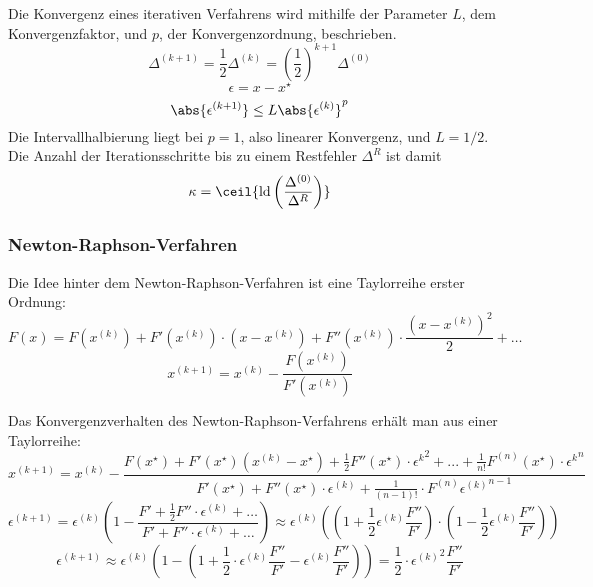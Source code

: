 Die Konvergenz eines iterativen Verfahrens wird mithilfe der Parameter $L$, dem Konvergenzfaktor, und $p$, der Konvergenzordnung, beschrieben.
\[\Delta^{(k + 1)} = \frac{1}{2} \Delta^{(k)} = (\frac{1}{2})^{k + 1} \Delta^{(0)}\]
\[\epsilon = x - x^\star\]
\[\abs{\epsilon^{(k + 1)}} \le L \abs{\epsilon^{(k)}}^p\]
Die Intervallhalbierung liegt bei $p = 1$, also linearer Konvergenz, und $L = 1/2$. Die Anzahl der Iterationsschritte bis zu einem Restfehler $\Delta^R$ ist damit
\[\kappa = \ceil{\ld \left( \frac{\Delta^{(0)}}{\Delta^R}\right)}\]

\begin{center}
\end{center}

\subsubsection{Newton-Raphson-Verfahren} Die Idee hinter dem Newton-Raphson-Verfahren ist eine Taylorreihe erster Ordnung:
\[F(x) = F(x^{(k)}) + F'(x^{(k)}) \cdot (x - x^{(k)}) + F''(x^{(k)}) \cdot \frac{(x - x^{(k)})^2}{2} + \dots\]
\[x^{(k + 1)} = x^{(k)} - \frac{F(x^{(k)})}{F'(x^{(k)})}\]

Das Konvergenzverhalten des Newton-Raphson-Verfahrens erhält man aus einer Taylorreihe:
\[x^{(k + 1)} = x^{(k)} - \frac{F(x^\star) + F'(x^\star)(x^{(k)} - x^\star) + \frac{1}{2} F''(x^\star) \cdot {\epsilon^{k}}^2 + ... + \frac{1}{n!} F^{(n)}(x^\star) \cdot {\epsilon^{k}}^n}{F'(x^\star) + F''(x^\star) \cdot \epsilon^{(k)} + \frac{1}{(n - 1)!} \cdot F^{(n)} {\epsilon^{(k)}}^{n - 1}}\]
\[\epsilon^{(k + 1)} = \epsilon^{(k)} \left( 1 - \frac{F' + \frac{1}{2} F'' \cdot \epsilon^{(k)} + \dots}{F' + F'' \cdot \epsilon^{(k)} + \dots} \right) \approx \epsilon^{(k)} \left( \left(1 + \frac{1}{2} \epsilon^{(k)} \frac{F''}{F'} \right) \cdot \left( 1 - \frac{1}{2} \epsilon^{(k)} \frac{F''}{F'} \right) \right)\]
\[\epsilon^{(k + 1)} \approx \epsilon^{(k)} \left( 1 - \left( 1 + \frac{1}{2} \cdot \epsilon^{(k)} \frac{F''}{F'} - \epsilon^{(k)} \frac{F''}{F'}\right)\right) = \frac{1}{2} \cdot {\epsilon^{(k)}}^2 \frac{F''}{F'}\]

